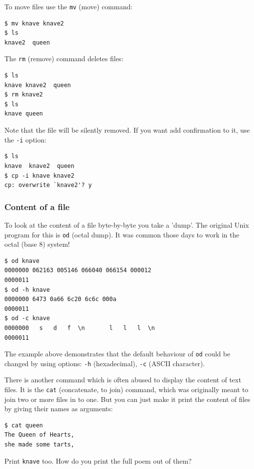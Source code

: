 \documentclass[11pt,a4paper,twoside]{article}
\begin{document}
To move files use the \texttt{mv} (move) command:
\begin{lstlisting}[frame=single]
$ mv knave knave2
$ ls
knave2  queen
\end{lstlisting}

The \texttt{rm} (remove) command deletes files:
\begin{lstlisting}[frame=single]
$ ls
knave knave2  queen
$ rm knave2
$ ls
knave queen
\end{lstlisting}

Note that the file will be silently removed. If you want add confirmation
to it, use the \texttt{-i} option:

\begin{lstlisting}[frame=single]
$ ls
knave  knave2  queen
$ cp -i knave knave2
cp: overwrite `knave2'? y
\end{lstlisting}

\subsubsection{Content of a file}

To look at the content of a file byte-by-byte you take a 'dump'. The original
Unix program for this is \texttt{od} (octal dump). It was common those days 
to work in the octal (base 8) system!

\begin{lstlisting}[frame=single]
$ od knave
0000000 062163 005146 066040 066154 000012
0000011
$ od -h knave
0000000 6473 0a66 6c20 6c6c 000a
0000011
$ od -c knave
0000000   s   d   f  \n       l   l   l  \n
0000011
\end{lstlisting}

The example above demonstrates that the default behaviour of \texttt{od} 
could be changed by using options: \texttt{-h} (hexadecimal), \texttt{-c}
(ASCII character).

There is another command which is often abused to display the content
of text files. It is the \texttt{cat} (concatenate, to join) command, 
which was originally meant to join two or more files in to one. But you 
can just make it print the content of files by giving their names as 
arguments:

\begin{lstlisting}[frame=single]
$ cat queen
The Queen of Hearts,
she made some tarts,
\end{lstlisting}

Print \texttt{knave} too. How do you print the full poem out of them?
\end{document}
